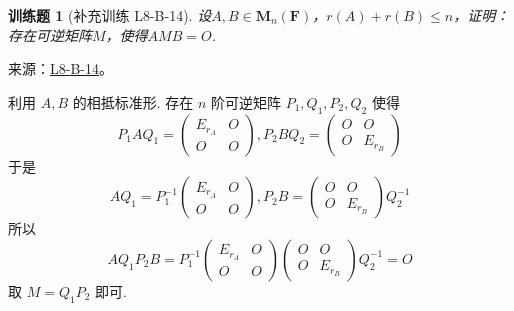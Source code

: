 \documentclass[12pt,fontset=fandol]{ctexart}
\newtheorem{exercise}{训练题}[section]
\begin{document}
\begin{exercise}[补充训练 L8-B-14]\label{prob:L8-B-14}
设$A,B \in \mathbf{M}_n(\mathbf{F})$，$r(A)+r(B) \leqslant n$，证明：存在可逆矩阵$M$，使得$AMB=O$.
\end{exercise}
\noindent 来源：\href{https://github.com/yhwu-is/Linear-Algebra-Left-Undone/blob/new/%E8%AE%B2%E4%B9%89/%E4%B8%93%E9%A2%98/8%20%E7%9B%B8%E6%8A%B5%E6%A0%87%E5%87%86%E5%BD%A2.tex}{L8-B-14}。
\begin{solve}
利用 $A,B$ 的相抵标准形. 存在 $n$ 阶可逆矩阵 $P_1,Q_1,P_2,Q_2$ 使得
          \[P_1AQ_1=\begin{pmatrix}E_{r_A} & O \\ O & O\end{pmatrix},P_2BQ_2=\begin{pmatrix}O & O \\ O & E_{r_B}\end{pmatrix}\]
          于是 \[AQ_1=P_1^{-1}\begin{pmatrix}E_{r_A} & O \\ O & O\end{pmatrix},P_2B=\begin{pmatrix}O & O \\ O & E_{r_B}\end{pmatrix}Q_2^{-1}\]
          所以 \[AQ_1P_2B=P_1^{-1}\begin{pmatrix}E_{r_A} & O \\ O & O\end{pmatrix}\begin{pmatrix}O & O \\ O & E_{r_B}\end{pmatrix}Q_2^{-1}=O\]
          取 $M=Q_1P_2$ 即可.
\end{solve}
\end{document}
